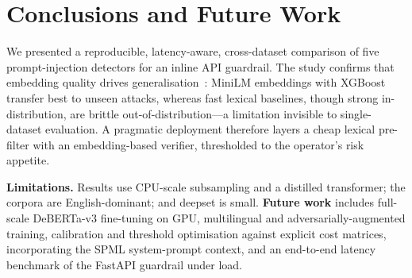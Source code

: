 \documentclass[conference]{IEEEtran}
\begin{document}
\section{Conclusions and Future Work}\label{sec:conclusion}
We presented a reproducible, latency-aware, cross-dataset comparison of five
prompt-injection detectors for an inline API guardrail. The study confirms that
embedding quality drives generalisation~\cite{ayub2024embedding,
rahman2024multilingual}: MiniLM embeddings with XGBoost transfer best to unseen
attacks, whereas fast lexical baselines, though strong in-distribution, are
brittle out-of-distribution---a limitation invisible to single-dataset
evaluation. A pragmatic deployment therefore layers a cheap lexical pre-filter
with an embedding-based verifier, thresholded to the operator's risk appetite.

\textbf{Limitations.} Results use CPU-scale subsampling and a distilled
transformer; the corpora are English-dominant; and deepset is small.
\textbf{Future work} includes full-scale DeBERTa-v3 fine-tuning on GPU,
multilingual and adversarially-augmented training, calibration and threshold
optimisation against explicit cost matrices, incorporating the SPML
system-prompt context, and an end-to-end latency benchmark of the FastAPI guardrail
under load.



\end{document}
